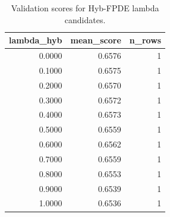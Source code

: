\begin{table}[t]
\caption{Validation scores for Hyb-FPDE lambda candidates.}
\label{tab:lambda_distribution_computed}
\centering
\begin{tabular}{rrr}
\toprule
lambda\_hyb & mean\_score & n\_rows \\
\midrule
0.0000 & 0.6576 & 1 \\
0.1000 & 0.6575 & 1 \\
0.2000 & 0.6570 & 1 \\
0.3000 & 0.6572 & 1 \\
0.4000 & 0.6573 & 1 \\
0.5000 & 0.6559 & 1 \\
0.6000 & 0.6562 & 1 \\
0.7000 & 0.6559 & 1 \\
0.8000 & 0.6553 & 1 \\
0.9000 & 0.6539 & 1 \\
1.0000 & 0.6536 & 1 \\
\bottomrule
\end{tabular}

\end{table}
